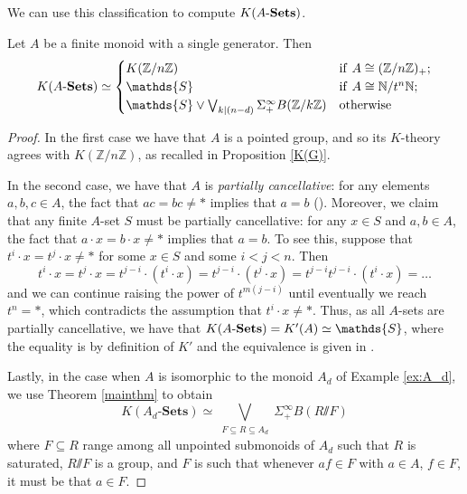 \documentclass[11pt]{amsart}
\renewcommand{\ss}{\mathord{\sslash}}
\begin{document}
We can use this classification to compute $K(A\text{-}\mathbf{Sets})$. 

\begin{proposition}
    Let $A$ be a finite monoid with a single generator. Then 
    \[K(\ASets)\simeq\begin{cases} K(\mathbb{Z}/n\mathbb{Z}) \caseif A\cong (\mathbb{Z}/n\mathbb{Z})_+;\\
    \mathds{S} \caseif A\cong \mathbb{N}/t^n\mathbb{N};\\
    \mathds{S}\vee\bigvee_{k\vert (n-d)} \Sigma^\infty_+ B(\mathbb{Z}/k\mathbb{Z}) \caseotherwise\end{cases}\]
\end{proposition}
\begin{proof}
In the first case we have that $A$ is a pointed group, and so its $K$-theory agrees with $K(\mathbb{Z}/n\mathbb{Z})$, as recalled in Proposition \ref{K(G)}. 

In the second case, we have that $A$ is \emph{partially cancellative}: for any elements $a,b,c\in A$, the fact that $ac=bc\neq *$ implies that $a=b$ (\cite[Definition 1.1]{Hchuck}). Moreover, we claim that any finite $A$-set $S$ must be partially cancellative: for any $x\in S$ and $a,b\in A$, the fact that $a\cdot x=b\cdot x\neq *$ implies that $a=b$. 
To see this, suppose that $t^i\cdot x=t^j\cdot x\neq *$ for some $x\in S$ and some $i<j<n$. Then \[t^i\cdot x=t^j\cdot x=t^{j-i}\cdot (t^i\cdot x)=t^{j-i}\cdot (t^j\cdot x)=t^{j-i}t^{j-i}\cdot (t^i\cdot x)=\dots\] and we can continue raising the power of $t^{m(j-i)}$ until eventually we reach $t^n=*$, which contradicts the assumption that $t^i\cdot x\neq *$. Thus, as all $A$-sets are partially cancellative, we have that $K(\ASets)=K'(A)\simeq \mathds{S}$, where the equality is by definition of $K'$ and the equivalence is given in \cite[Lemma 3.3]{Hchuck}.

Lastly, in the case when $A$ is isomorphic to the monoid $A_d$ of Example \ref{ex:A_d}, we use Theorem \ref{mainthm} to obtain  \[K(A_d\text{-}\mathbf{Sets}) \simeq \bigvee_{\substack{F \subseteq R \subseteq A_d}} \Sigma^\infty_+ B(R\ss F)\] where $F\subseteq R$ range among all unpointed submonoids of $A_d$ such that $R$ is saturated, $R\ss F$ is a group, and $F$ is such that whenever $af\in F$ with $a\in A$, $f\in F$, it must be that $a\in F$. 


\end{proof}
\end{document}
